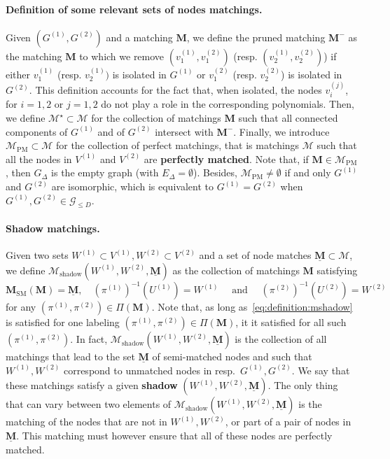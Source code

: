 \documentclass[final]{colt2026}
\newcommand{\1}{\mathbf{1}}
\begin{document}
\paragraph{Definition of some relevant sets of nodes matchings.} Given $(G^{(1)},G^{(2)})$ and a matching $\mathbf M$, we define the pruned matching $\mathbf{M}^-$ as the matching $\mathbf{M}$ to which we remove $(v_1^{(1)},v_1^{(2)})$ (resp. $(v_2^{(1)},v_2^{(2)})$) if either $v_1^{(1)}$ (resp. $v_2^{(1)})$ is isolated in $G^{(1)}$ or $v_1^{(2)}$ (resp. $v_2^{(2)}$) is isolated in $G^{(2)}$. This definition accounts for the fact that, when isolated, the nodes $v_i^{(j)}$, for $i=1,2$ or $j=1,2$ do not play a role in the corresponding polynomials. 
Then, we define  $\mathcal M^\star\subset \mathcal{M}$ for the collection of matchings $\mathbf{M}$ such that all connected components of $G^{(1)}$ and of $G^{(2)}$ intersect with $\mathbf{M}^-$.
Finally, we introduce  $\mathcal M_{\mathrm{PM}}\subset \mathcal{M}$ for 
  the collection of perfect matchings, that is matchings $\mathcal M$ such that all the nodes in $V^{(1)}$ and $V^{(2)}$ are {\bf perfectly matched}. Note that, if $\mathbf M\in \mathcal M_{\mathrm{PM}}$, then $G_{\Delta}$ is the empty graph (with $E_{\Delta} = \emptyset$). Besides, $\mathcal{M}_{\mathrm{PM}} \neq \emptyset$ if and only $G^{(1)}$ and $G^{(2)}$ are isomorphic, which is equivalent to $G^{(1)}= G^{(2)}$ when $G^{(1)}, G^{(2)} \in \mathcal G_{\leq D}$. 



  \paragraph{Shadow matchings.} Given two sets $W^{(1)}\subset V^{(1)}, W^{(2)} \subset V^{(2)}$ and a set of node matches $\underline{\mathbf M} \subset \mathcal M$, we define $\mathcal M_{\mathrm{shadow}}(W^{(1)}, W^{(2)}, \underline{\mathbf M} )$ as the collection of matchings $\mathbf{M}$ satisfying 
 \begin{equation}\label{eq:definition:mshadow}
  \mathbf M_{\mathrm{SM}}(\mathbf M) = \underline{\mathbf M}, \quad  (\pi^{(1)})^{-1}(U^{(1)})= W^{(1)}\quad \text{ and }\quad (\pi^{(2)})^{-1}(U^{(2)}) = W^{(2)} \enspace  
 \end{equation}
  for any  $(\pi^{(1)},\pi^{(2)})\in \Pi(\mathbf{M})$. Note that, as long as~\eqref{eq:definition:mshadow} is satisfied for one labeling $(\pi^{(1)},\pi^{(2)})\in \Pi(\mathbf{M})$, it it satisfied for all such $(\pi^{(1)},\pi^{(2)})$. In fact, $\mathcal M_{\mathrm{shadow}}(W^{(1)}, W^{(2)}, \underline{\mathbf M} )$ is the collection of all matchings that lead to the set $\underline{\mathbf M} $ of semi-matched nodes and such that  $W^{(1)}, W^{(2)}$ correspond  to unmatched nodes in resp.~$G^{(1)}, G^{(2)}$. We say that these matchings satisfy a given {\bf shadow} $(W^{(1)}, W^{(2)}, \underline{\mathbf M} )$. The only thing that can vary between two elements of $\mathcal M_{\mathrm{shadow}}(W^{(1)}, W^{(2)}, \underline{\mathbf M} )$ is the matching of the nodes that are not in $W^{(1)}, W^{(2)}$, or part of a pair of nodes in $\underline{\mathbf M}$. This matching must however ensure that all of these nodes are perfectly matched.
\end{document}
